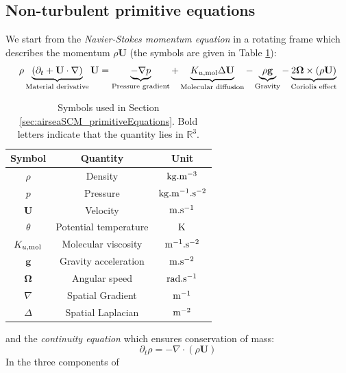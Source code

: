 \subsection{Non-turbulent primitive equations}
\label{sec:airseaSCM_nonTurbulentPrimitiveEq}
We start from the \textit{Navier-Stokes momentum equation}
in a rotating frame
which describes the momentum $\rho \mathbf{U}$
(the symbols are given in Table
\ref{tab:airseaSCM_primitiveEquationsSymbols}):
\begin{equation}
\label{eq:airseaSCM_momentumNavierStokes}
\rho \underbrace{
\left(\partial_t + \mathbf{U} \cdot \nabla \right)
	}_{\text{Material derivative}} \mathbf{U}
=
\underbrace{
	- \nabla p
}_{\text{Pressure gradient}}
+
\underbrace{
	K_{u, {\rm mol}} \Delta \mathbf{U}
}_{\text{Molecular diffusion}}
-
\underbrace{
	\rho \mathbf{g}
}_{\text{Gravity}}
-
\underbrace{
2 \mathbf{\Omega} \times (\rho \mathbf{U})
}_{\text{Coriolis effect}}
\end{equation}
\begin{table}
\centering
\begin{tabular}{c|c|c}
Symbol & Quantity & Unit \\
\hline
$\rho$& {Density} & ${\rm kg}.{\rm m}^{-3}$ \\
$p$   & {Pressure} & ${\rm kg}.{\rm m}^{-1}.{\rm s}^{-2}$ \\
$\mathbf{U}$ & {Velocity}& ${\rm m}.{\rm s}^{-1}$ \\
$\theta$ & {Potential temperature}& ${\rm K}$ \\
$K_{u, {\rm mol}}$ & {Molecular viscosity}& ${\rm m}^{-1}.{\rm s}^{-2}$ \\
$\mathbf{g}$ & {Gravity acceleration}& ${\rm m}.{\rm s}^{-2}$ \\
$\mathbf{\Omega}$ & {Angular speed}& ${\rm rad}.{\rm s}^{-1}$ \\
$\nabla$ & {Spatial Gradient} & ${\rm m}^{-1}$\\
$\Delta$ & {Spatial Laplacian} &${\rm m}^{-2}$
\end{tabular}
\caption{Symbols used in Section
\ref{sec:airseaSCM_primitiveEquations}. Bold letters
indicate that the quantity lies in $\mathbb{R}^3$.}
\label{tab:airseaSCM_primitiveEquationsSymbols}
\end{table}
and the \textit{continuity equation} which ensures
conservation of mass:
\begin{equation}
\label{eq:airseaSCM_conservationMass}
\partial_t \rho = - \nabla \cdot (\rho \mathbf{U})
\end{equation}
In the three components of
